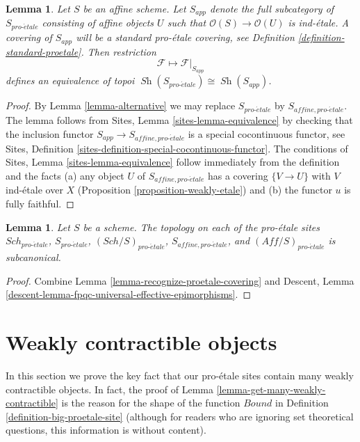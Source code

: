 \documentclass{stacks-project}
\theoremstyle{plain}
\newtheorem{lemma}[subsection]{Lemma}
\theoremstyle{definition}
\theoremstyle{remark}
\numberwithin{equation}{subsection}
\def\Sch{\mathit{Sch}}
\def\Sh{\mathop{\mathit{Sh}}\nolimits}
\def\proetale{{pro\text{-}\acute{e}tale}}
\begin{document}
\begin{lemma}
\label{lemma-affine-alternative}
Let $S$ be an affine scheme. Let $S_{app}$ denote the full subcategory
of $S_\proetale$ consisting of affine objects $U$ such that
$\mathcal{O}(S) \to \mathcal{O}(U)$ is ind-\'etale. A covering of
$S_{app}$ will be a standard pro-\'etale covering, see
Definition \ref{definition-standard-proetale}.
Then restriction
$$
\mathcal{F} \longmapsto \mathcal{F}|_{S_{app}}
$$
defines an equivalence of topoi $\Sh(S_\proetale) \cong \Sh(S_{app})$.
\end{lemma}

\begin{proof}
By Lemma \ref{lemma-alternative} we may replace $S_\proetale$ by
$S_{affine, \proetale}$.
The lemma follows from Sites, Lemma \ref{sites-lemma-equivalence}
by checking that the inclusion functor $S_{app} \to S_{affine, \proetale}$
is a special cocontinuous functor, see
Sites, Definition \ref{sites-definition-special-cocontinuous-functor}.
The conditions of Sites, Lemma \ref{sites-lemma-equivalence}
follow immediately from the definition and the facts
(a) any object $U$ of $S_{affine, \proetale}$ has a covering
$\{V \to U\}$ with $V$ ind-\'etale over $X$
(Proposition \ref{proposition-weakly-etale})
and (b) the functor $u$ is fully faithful.
\end{proof}

\begin{lemma}
\label{lemma-proetale-subcanonical}
Let $S$ be a scheme. The topology on each of the pro-\'etale sites
$\Sch_\proetale$, $S_\proetale$, $(\Sch/S)_\proetale$,
$S_{affine, \proetale}$, and $(\textit{Aff}/S)_\proetale$ is subcanonical.
\end{lemma}

\begin{proof}
Combine Lemma \ref{lemma-recognize-proetale-covering} and
Descent, Lemma \ref{descent-lemma-fpqc-universal-effective-epimorphisms}.
\end{proof}





\section{Weakly contractible objects}
\label{section-weakly-contractible}

\noindent
In this section we prove the key fact that our pro-\'etale sites
contain many weakly contractible objects. In fact, the proof of
Lemma \ref{lemma-get-many-weakly-contractible} is the reason for
the shape of the function $Bound$ in
Definition \ref{definition-big-proetale-site} (although
for readers who are ignoring set theoretical questions, this
information is without content).
\end{document}
